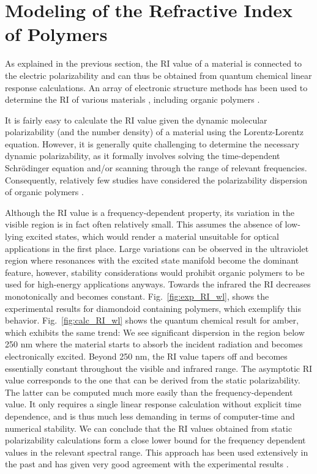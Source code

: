 \section{Modeling of the Refractive Index of Polymers}

As explained in the previous section, the RI value of a material is connected to the electric polarizability and can thus be obtained from quantum chemical linear response calculations. An array of electronic structure methods has been used to determine the RI of various materials \cite{Ando2006, Rocquefelte2004, Jensen1983, Rabah2003, Amrani2006, Reshak2014, Azam2013,Baev2007,Asai2011,Takano2010,Seto2010}, including organic polymers \cite{Ksianzou2006, Zeinalipour-Yazdi2008, Yu2007,Holder2006,Ortyl2003,}. %

It is fairly easy to calculate the RI value given the dynamic molecular polarizability (and the number density) of a material using the Lorentz-Lorentz equation. However, it is generally quite challenging to determine the necessary dynamic polarizability, as it formally involves solving the time-dependent Schr\"odinger equation and/or scanning through the range of relevant frequencies. Consequently, relatively few studies have considered the polarizability dispersion of organic polymers \cite{Rowan2011, Lenz2011}. 

Although the RI value is a frequency-dependent property, its variation in the visible region is in fact often relatively small. This assumes the absence of low-lying excited states, which would render a material unsuitable for optical applications in the first place. Large variations can be observed in the ultraviolet region where resonances with the excited state manifold become the dominant feature, however, stability considerations would prohibit organic polymers to be used for high-energy applications anyways. Towards the infrared the RI decreases monotonically and becomes constant. Fig.\ \ref{fig:exp_RI_wl}, shows the experimental results for diamondoid containing polymers, which exemplify this behavior. Fig.\ \ref{fig:calc_RI_wl} shows the quantum chemical result for amber, which exhibits the same trend: We see significant dispersion in the region below 250 nm where the material starts to absorb the incident radiation and becomes electronically excited. Beyond 250 nm, the RI value tapers off and becomes essentially constant throughout the visible and infrared range. The asymptotic RI value corresponds to the one that can be derived from the static polarizability. The latter can be computed much more easily than the frequency-dependent value. It only requires a single linear response calculation without explicit time dependence, and is thus much less demanding in terms of computer-time and numerical stability. We can conclude that the RI values obtained from static polarizability calculations form a close lower bound for the frequency dependent values in the relevant spectral range. This approach has been used extensively in the past and has given very good agreement with the experimental results \cite{Ksianzou2006, Zeinalipour-Yazdi2008, Lee2011, Park2011, Isborn2007, Azim-Araghi2012}. 

